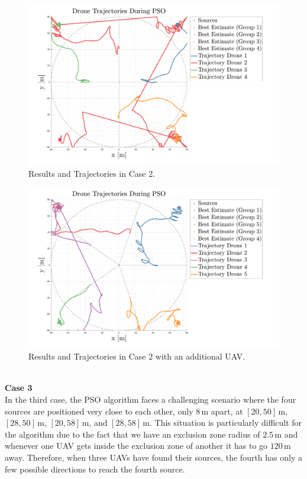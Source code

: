 \documentclass[main]{subfiles}
\begin{document}
\begin{figure}
    \centering
    \includegraphics[width=1.06\textwidth]{images/case_2.pdf}
    \caption[PSO Case 2]{Results and Trajectories in Case 2.}
    \label{fig:case2}
\end{figure}
\begin{figure}[H]
    \centering
    \includegraphics[width=1.06\textwidth]{images/case_2_more.pdf}
    \caption[PSO Case 2]{Results and Trajectories in Case 2 with an additional UAV.}
    \label{fig:case2more}
\end{figure}

\noindent\\
\textbf{Case 3}\\
In the third case, the PSO algorithm faces a challenging scenario where 
the four sources are positioned very close to each other, only \(8 \, \text{m}\) apart, 
at \([20, 50] \, \text{m}\), \([28, 50] \, \text{m}\), \([20, 58] \, \text{m}\), and \([28, 58] \, \text{m}\). 
This situation is particularly difficult for the algorithm due to 
the fact that we have an exclusion zone radius of \(2.5 \, \text{m}\) and 
whenever one UAV gets inside the exclusion zone of another
it has to go \(120 \, \text{m}\) away.
Therefore, when three UAVs have found their sources, the fourth has only a few
possible directions to reach the fourth source.
\end{document}
